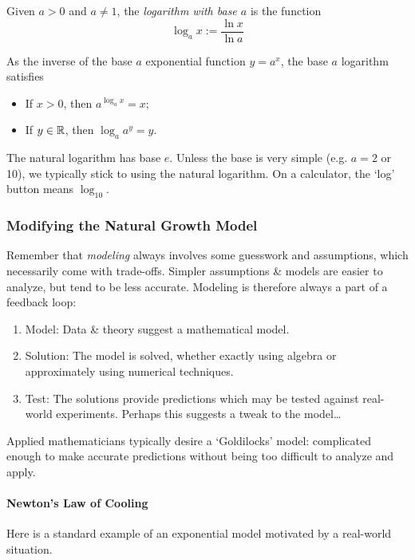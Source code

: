 \begin{defn}{}{}
	Given $a>0$ and $a\neq 1$, the \emph{logarithm with base $a$} is the function
	\[
		\log_ax :=\frac{\ln x}{\ln a}
	\]
\end{defn}

As the inverse of the base $a$ exponential function $y=a^x$, the base $a$ logarithm satisfies
\begin{itemize}
	\item If $x>0$, then $a^{\log_a x}=x$;
	\item If $y\in\mathbb{R}$, then $\log_a a^y=y$.
\end{itemize}
The natural logarithm has base $e$. Unless the base is very simple (e.g.{} $a=2$ or 10), we typically stick to using the natural logarithm. On a calculator, the `log' button means $\log_{10}$.


\subsubsection*{Modifying the Natural Growth Model}

Remember that \emph{modeling} always involves some guesswork and assumptions, which necessarily come with trade-offs. Simpler assumptions \& models are easier to analyze, but tend to be less accurate. Modeling is therefore always a part of a feedback loop:
\begin{enumerate}
  \item Model: Data \& theory suggest a mathematical model.
  \item Solution: The model is solved, whether exactly using algebra or approximately using numerical techniques.
  \item Test: The solutions provide predictions which may be tested against real-world experiments. Perhaps this suggests a tweak to the model\ldots
\end{enumerate}
Applied mathematicians typically desire a `Goldilocks' model: complicated enough to make accurate predictions without being too difficult to analyze and apply.



\paragraph{Newton's Law of Cooling}

Here is a standard example of an exponential model motivated by a real-world situation.

